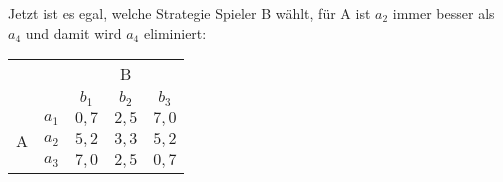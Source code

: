 Jetzt ist es egal, welche Strategie Spieler B wählt, für A ist $a_2$ immer besser als
$a_4$ und damit wird $a_4$ eliminiert:

\begin{center}
  \begin{tabular}{ccccc}
    & & \multicolumn{3}{c}{B}\\
    & & $b_1$ & $b_2$ & $b_3$\\
    \multirow{4}{*}{A} & $a_1$ & $0,7$ & $2,5$ & $7,0$\\
    & $a_2$ & $5,2$ & $3,3$ & $5,2$\\
    & $a_3$ & $7,0$ & $2,5$ & $0,7$\\
  \end{tabular}
\end{center}

